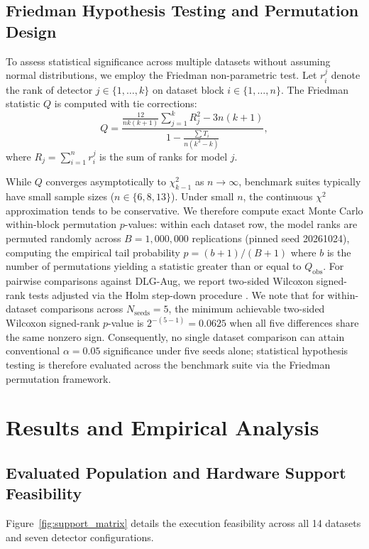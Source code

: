 \documentclass[11pt,a4paper]{article}
\begin{document}
\subsection{Friedman Hypothesis Testing and Permutation Design}
To assess statistical significance across multiple datasets without assuming normal distributions, we employ the Friedman non-parametric test. Let $r_i^j$ denote the rank of detector $j \in \{1, \dots, k\}$ on dataset block $i \in \{1, \dots, n\}$. The Friedman statistic $Q$ is computed with tie corrections:
\begin{equation}
Q = \frac{\frac{12}{n k (k+1)} \sum_{j=1}^k R_j^2 - 3 n (k+1)}{1 - \frac{\sum T_i}{n(k^3 - k)}},
\label{eq:friedman_q}
\end{equation}
where $R_j = \sum_{i=1}^n r_i^j$ is the sum of ranks for model $j$. 

While $Q$ converges asymptotically to $\chi^2_{k-1}$ as $n \to \infty$, benchmark suites typically have small sample sizes ($n \in \{6, 8, 13\}$). Under small $n$, the continuous $\chi^2$ approximation tends to be conservative. We therefore compute exact Monte Carlo within-block permutation $p$-values: within each dataset row, the model ranks are permuted randomly across $B=1,000,000$ replications (pinned seed 20261024), computing the empirical tail probability $p = (b + 1) / (B + 1)$ where $b$ is the number of permutations yielding a statistic greater than or equal to $Q_{\mathrm{obs}}$. For pairwise comparisons against DLG-Aug, we report two-sided Wilcoxon signed-rank tests adjusted via the Holm step-down procedure \cite{holm1979}. We note that for within-dataset comparisons across $N_{\mathrm{seeds}} = 5$, the minimum achievable two-sided Wilcoxon signed-rank $p$-value is $2^{-(5-1)} = 0.0625$ when all five differences share the same nonzero sign. Consequently, no single dataset comparison can attain conventional $\alpha = 0.05$ significance under five seeds alone; statistical hypothesis testing is therefore evaluated across the benchmark suite via the Friedman permutation framework.

\section{Results and Empirical Analysis}
\label{sec:results}

\subsection{Evaluated Population and Hardware Support Feasibility}
Figure~\ref{fig:support_matrix} details the execution feasibility across all 14 datasets and seven detector configurations.
\end{document}
